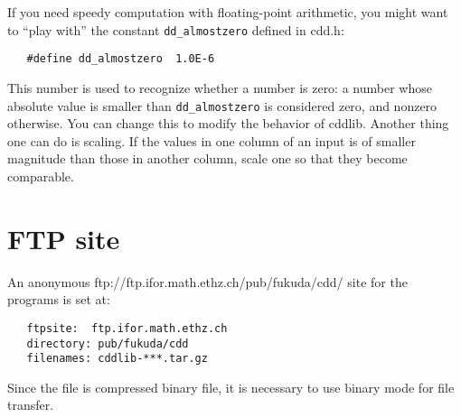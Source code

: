 \documentclass[11pt]{article}
\newcommand {\0} {{\bf 0}}
\begin{document}
If you need speedy computation with floating-point arithmetic,
you might want to ``play with'' the constant {\tt dd\_almostzero} 
defined in cdd.h:

\begin{verbatim}
   #define dd_almostzero  1.0E-6
\end{verbatim}
\noindent
This number is used to recognize whether a number is zero:  
a number whose absolute value is smaller
than {\tt dd\_almostzero} is considered zero, and nonzero otherwise.
You can change this to modify the behavior of cddlib.
Another thing one can do is scaling.  If the values in one column of
an input is of smaller magnitude than those in another column, 
scale one so that they become comparable.

\section{FTP site}  \label{FTP}
An anonymous 
{ftp://ftp.ifor.math.ethz.ch/pub/fukuda/cdd/} site for the programs is set at:
\begin{verbatim}
   ftpsite:  ftp.ifor.math.ethz.ch
   directory: pub/fukuda/cdd
   filenames: cddlib-***.tar.gz
\end{verbatim}
Since the file is compressed binary file, it is necessary to use binary mode for
file transfer.
\end{document}
